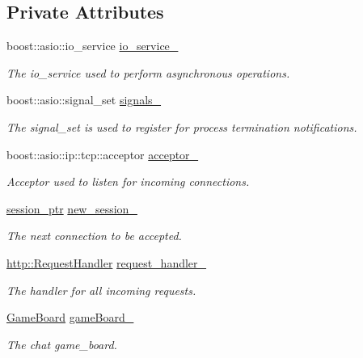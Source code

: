 \subsection*{Private Attributes}
\begin{DoxyCompactItemize}
\item 
boost\+::asio\+::io\+\_\+service \hyperlink{classwebsocket_1_1Server_ab3dc5f36bb4b0913c803915d3191a771}{io\+\_\+service\+\_\+}
\begin{DoxyCompactList}\small\item\em The io\+\_\+service used to perform asynchronous operations. \end{DoxyCompactList}\item 
boost\+::asio\+::signal\+\_\+set \hyperlink{classwebsocket_1_1Server_a85a9160e9b9f070a4bf8e149623a5a6d}{signals\+\_\+}
\begin{DoxyCompactList}\small\item\em The signal\+\_\+set is used to register for process termination notifications. \end{DoxyCompactList}\item 
boost\+::asio\+::ip\+::tcp\+::acceptor \hyperlink{classwebsocket_1_1Server_a377152422807e2f13cc1c6bb18fb416f}{acceptor\+\_\+}
\begin{DoxyCompactList}\small\item\em Acceptor used to listen for incoming connections. \end{DoxyCompactList}\item 
\hyperlink{namespacewebsocket_a12d8500a66e77dc9bfbff046b86714d8}{session\+\_\+ptr} \hyperlink{classwebsocket_1_1Server_a86916b413a3577cb17aed4cda031691e}{new\+\_\+session\+\_\+}
\begin{DoxyCompactList}\small\item\em The next connection to be accepted. \end{DoxyCompactList}\item 
\hyperlink{classwebsocket_1_1http_1_1RequestHandler}{http\+::\+Request\+Handler} \hyperlink{classwebsocket_1_1Server_abee763cfdb56554f90a98ed4b2fc2600}{request\+\_\+handler\+\_\+}
\begin{DoxyCompactList}\small\item\em The handler for all incoming requests. \end{DoxyCompactList}\item 
\hyperlink{classwebsocket_1_1GameBoard}{Game\+Board} \hyperlink{classwebsocket_1_1Server_a412c87233cbe63db77ba955f413c5ef0}{game\+Board\+\_\+}
\begin{DoxyCompactList}\small\item\em The chat game\+\_\+board. \end{DoxyCompactList}\end{DoxyCompactItemize}


